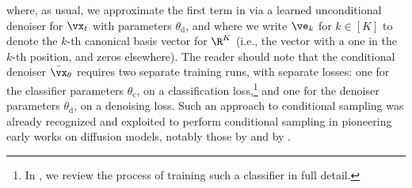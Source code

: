 \documentclass[../../book-main.tex]{subfiles}
\begin{document}
where, as usual, we approximate the first term in
 via a learned
unconditional denoiser for $\vx_t$ with parameters $\theta_{\mathrm{d}}$, and
where we write $\ve_k$ for $k \in [K]$ to denote the $k$-th canonical basis
vector for $\R^K$ (i.e., the vector with
a one in the $k$-th position, and zeros elsewhere).
The reader should note that the conditional denoiser $\bar{\vx}_{\theta}$
requires two separate training runs, with separate losses: one for the
classifier parameters $\theta_{\mathrm{c}}$, on a classification
loss,\footnote{In , we review the process of training such
a classifier in full detail.} and one for the denoiser parameters
$\theta_{\mathrm{d}}$, on a denoising loss. Such an approach to conditional
sampling was already recognized and exploited to perform conditional sampling in
pioneering early works on diffusion models, notably those by
\citet{Sohl-Dickstein2015} and by \citet{song2020score}.

\end{document}
